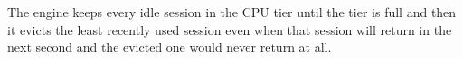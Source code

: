 \documentclass{article}
\begin{document}
The engine keeps every idle session in the CPU tier until the tier is full and then it evicts the least recently used session even when that session will return in the next second and the evicted one would never return at all.
\end{document}
